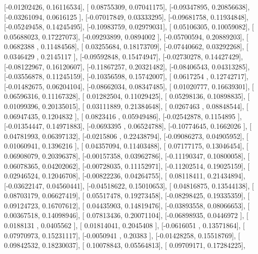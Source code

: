\documentclass{article}
\begin{document}
       [-0.01202426,  0.16116534],
       [ 0.08755309,  0.07041175],
       [-0.09347895,  0.20856638],
       [-0.03261094,  0.0616125 ],
       [-0.07017849,  0.03333295],
       [-0.09681758,  0.11934848],
       [-0.05249458,  0.14245495],
       [-0.10983759,  0.02979031],
       [ 0.05106305,  0.10059082],
       [ 0.05688023,  0.17227073],
       [-0.09293899,  0.0894002 ],
       [-0.05700594,  0.20889203],
       [ 0.0682388 ,  0.11484568],
       [ 0.03255684,  0.18173709],
       [-0.07440662,  0.03292268],
       [ 0.0346429 ,  0.2145117 ],
       [-0.09592848,  0.15474947],
       [-0.02730278,  0.14427429],
       [-0.08122967,  0.16120607],
       [-0.11867257,  0.20321482],
       [-0.08406543,  0.04313285],
       [-0.03556878,  0.11245159],
       [-0.10356598,  0.15742007],
       [ 0.0617254 ,  0.12742717],
       [-0.01482675,  0.06204104],
       [-0.08662034,  0.08347485],
       [ 0.01020777,  0.16639301],
       [ 0.06596316,  0.11167328],
       [ 0.01282504,  0.11029425],
       [ 0.05298136,  0.10898835],
       [ 0.01099396,  0.20135015],
       [ 0.03111889,  0.21384648],
       [ 0.0267463 ,  0.08848544],
       [ 0.06947435,  0.1204832 ],
       [ 0.0823416 ,  0.05949486],
       [-0.02542878,  0.1154895 ],
       [-0.01354447,  0.14971883],
       [-0.0693395 ,  0.06524788],
       [-0.10774645,  0.1662026 ],
       [ 0.04781993,  0.06397132],
       [-0.0215806 ,  0.22438794],
       [-0.09086273,  0.04905952],
       [ 0.01060941,  0.1396216 ],
       [ 0.04357094,  0.11403488],
       [ 0.07177175,  0.13046454],
       [ 0.06908079,  0.20396378],
       [-0.00157358,  0.03962786],
       [-0.11190347,  0.10800058],
       [ 0.06078365,  0.04202062],
       [-0.00728035,  0.11152971],
       [-0.11202514,  0.19025159],
       [ 0.02946524,  0.12046708],
       [-0.00822236,  0.04264755],
       [ 0.08118411,  0.21434894],
       [-0.03622147,  0.04560441],
       [-0.04518622,  0.15010653],
       [ 0.04816875,  0.13544138],
       [ 0.08703179,  0.06627419],
       [ 0.05517478,  0.19273458],
       [-0.08298425,  0.19335359],
       [ 0.09124723,  0.16707612],
       [ 0.04435903,  0.14819476],
       [-0.03893558,  0.08066653],
       [ 0.00367518,  0.14098946],
       [ 0.07813436,  0.20071104],
       [-0.06898935,  0.0446972 ],
       [ 0.0188131 ,  0.0405562 ],
       [ 0.01814041,  0.2045408 ],
       [-0.0616051 ,  0.13571864],
       [ 0.07970973,  0.15231117],
       [-0.0050941 ,  0.20383   ],
       [-0.01428258,  0.15518769],
       [ 0.09842532,  0.18230037],
       [ 0.10078843,  0.05564813],
       [ 0.09709171,  0.17284225],
\end{document}
